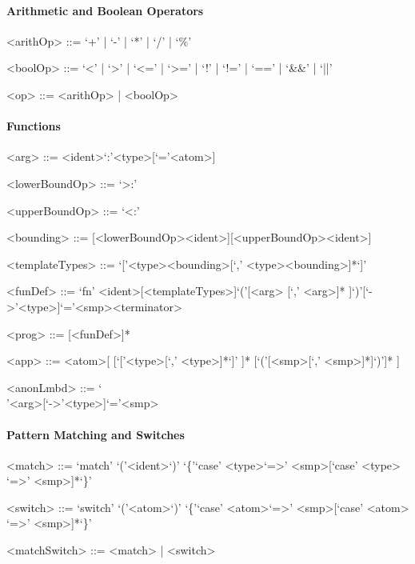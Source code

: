\documentclass[11pt]{article} %
\begin{document}
\paragraph{Arithmetic and Boolean Operators}

\begin{grammar}

<arithOp> ::= `+' | `-' | `*' | `/' | `\%'

<boolOp> ::= `<' | `>' | `<=' | `>=' | `!' | `!=' | `==' | `\&\&' | `||'

<op> ::= <arithOp> | <boolOp> 

\end{grammar}

\paragraph{Functions}

\begin{grammar}

<arg> ::= <ident>`:'<type>[`='<atom>]

<lowerBoundOp> ::= `>:'

<upperBoundOp> ::= `<:'

<bounding> ::= [<lowerBoundOp><ident>][<upperBoundOp><ident>]

<templateTypes> ::= `['<type><bounding>[`,' <type><bounding>]*`]'

<funDef> ::= `fn' <ident>[<templateTypes>]`('[<arg> [`,' <arg>]* ]`)'[`->'<type>]`='<smp><terminator>

<prog> ::= [<funDef>]*

<app> ::= <atom>[ [`['<type>[`,' <type>]*`]' ]* [`('[<smp>[`,' <smp>]*]`)']* ]

<anonLmbd> ::= `\\'<arg>[`->'<type>]`='<smp>

\end{grammar}

\paragraph{Pattern Matching and Switches}

\begin{grammar}

<match> ::= `match' `('<ident>`)' `\{'`case' <type>`=>' <smp>[`case' <type> `=>' <smp>]*`\}'

<switch> ::= `switch' `('<atom>`)' `\{'`case' <atom>`=>' <smp>[`case' <atom> `=>' <smp>]*`\}'

<matchSwitch> ::= <match> | <switch>

\end{grammar}
\end{document}

